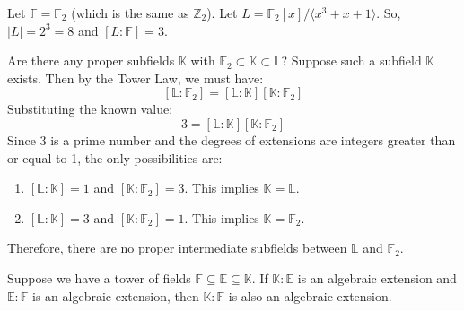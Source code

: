 \begin{example}
Let $\mathbb{F} = \mathbb{F}_2$ (which is the same as $\mathbb{Z}_2$).
Let $L = \mathbb{F}_2[x]/\langle x^3+x+1 \rangle$.
So, $|L| = 2^3 = 8$ and $[L:\mathbb{F}] = 3$.

Are there any proper subfields $\mathbb{K}$ with $\mathbb{F}_2 \subset \mathbb{K} \subset \mathbb{L}$?
Suppose such a subfield $\mathbb{K}$ exists. Then by the Tower Law, we must have:
\[ [\mathbb{L}:\mathbb{F}_2] = [\mathbb{L}:\mathbb{K}][\mathbb{K}:\mathbb{F}_2] \]
Substituting the known value:
\[ 3 = [\mathbb{L}:\mathbb{K}][\mathbb{K}:\mathbb{F}_2] \]
Since 3 is a prime number and the degrees of extensions are integers greater than or equal to 1, the only possibilities are:
\begin{enumerate}
    \item $[\mathbb{L}:\mathbb{K}]=1$ and $[\mathbb{K}:\mathbb{F}_2]=3$. This implies $\mathbb{K}=\mathbb{L}$.
    \item $[\mathbb{L}:\mathbb{K}]=3$ and $[\mathbb{K}:\mathbb{F}_2]=1$. This implies $\mathbb{K}=\mathbb{F}_2$.
\end{enumerate}
Therefore, there are no proper intermediate subfields between $\mathbb{L}$ and $\mathbb{F}_2$.
\end{example}




\begin{corollary} \label{cor:extextfinite}
Suppose we have a tower of fields $\mathbb{F} \subseteq \mathbb{E} \subseteq \mathbb{K}$. If $\mathbb{K}:\mathbb{E}$ is an algebraic extension and $\mathbb{E}:\mathbb{F}$ is an algebraic extension, then $\mathbb{K}:\mathbb{F}$ is also an algebraic extension.
\end{corollary}

